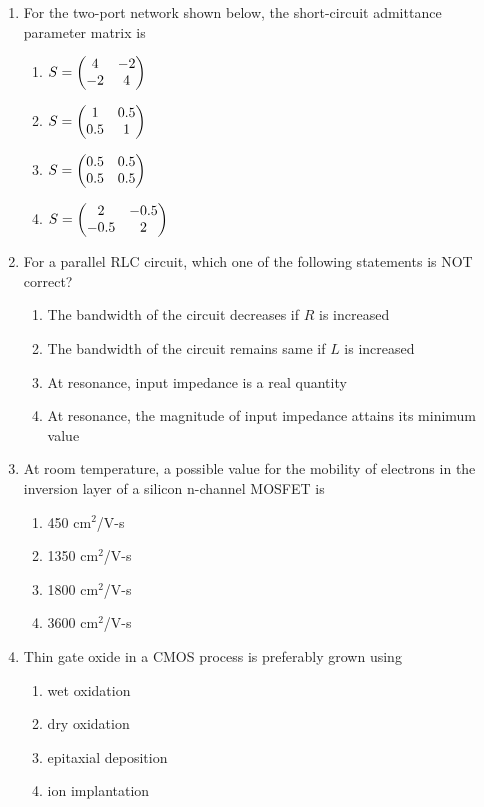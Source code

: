\documentclass[journal,12pt,onecolumn]{IEEEtran}
\begin{document}
\begin{enumerate}
\item For the two-port network shown below, the short-circuit admittance parameter matrix is
\begin{multicols}{2}
\begin{enumerate}
\item $S=\begin{pmatrix}4 & -2\\ -2 & 4\end{pmatrix}$
\item $S= \begin{pmatrix}1 & 0.5\\ 0.5 & 1\end{pmatrix}$
\item $S=\begin{pmatrix}0.5 & 0.5\\ 0.5 & 0.5\end{pmatrix}$
\item $S=\begin{pmatrix}2 & -0.5\\ -0.5 & 2\end{pmatrix}$
\end{enumerate}
\end{multicols}

\item For a parallel RLC circuit, which one of the following statements is NOT correct?
\begin{multicols}{2}
\begin{enumerate}
\item The bandwidth of the circuit decreases if $R$ is increased
\item The bandwidth of the circuit remains same if $L$ is increased
\item At resonance, input impedance is a real quantity
\item At resonance, the magnitude of input impedance attains its minimum value
\end{enumerate}
\end{multicols}

\item At room temperature, a possible value for the mobility of electrons in the inversion layer of a silicon n-channel MOSFET is
\begin{multicols}{2}
\begin{enumerate}
\item 450 cm$^2$/V-s
\item 1350 cm$^2$/V-s
\item 1800 cm$^2$/V-s
\item 3600 cm$^2$/V-s
\end{enumerate}
\end{multicols}

\item Thin gate oxide in a CMOS process is preferably grown using
\begin{multicols}{2}
\begin{enumerate}
\item wet oxidation
\item dry oxidation
\item epitaxial deposition
\item ion implantation
\end{enumerate}
\end{multicols}


\end{enumerate}
\end{document}
